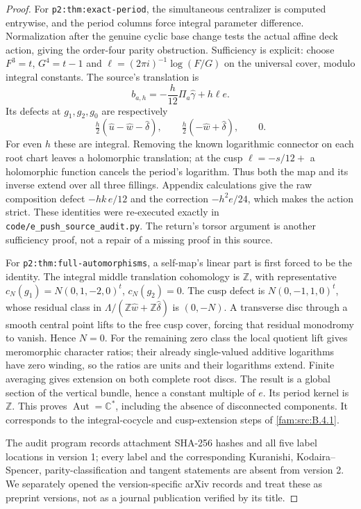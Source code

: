 \begin{proof}
For \texttt{p2:thm:exact-period}, the simultaneous centralizer
is computed entrywise, and the period columns force integral
parameter difference.  Normalization after the genuine cyclic
base change tests the actual affine deck action, giving the
order-four parity obstruction.  Sufficiency is explicit:
choose $F^3=t$, $G^4=t-1$ and
$\ell=(2\pi i)^{-1}\log(F/G)$ on the universal cover, modulo
integral constants.  The source's translation is
\[
 b_{a,h}=-\frac h{12}\Pi_a\widehat\gamma+h\ell e.
\]
Its defects at $g_1,g_2,g_0$ are respectively
\[
 \tfrac h2(\widehat u-\widehat w-\widehat\delta),\qquad
 \tfrac h2(-\widehat w+\widehat\delta),\qquad0.
\]
For even $h$ these are integral.  Removing the known logarithmic
connector on each root chart leaves a holomorphic translation;
at the cusp $\ell=-s/12+$ a holomorphic function cancels the
period's logarithm.  Thus both the map and its inverse extend
over all three fillings.  Appendix calculations give the raw
composition defect $-hk\,e/12$ and the correction
$-h^2e/24$, which makes the action strict.  These identities
were re-executed exactly in
\texttt{code/e\_push\_source\_audit.py}.  The return's torsor
argument is another sufficiency proof, not a repair of a
missing proof in this source.

For \texttt{p2:thm:full-automorphisms}, a self-map's linear
part is first forced to be the identity.  The integral middle
translation cohomology is $\mathbb Z$, with representative
$c_N(g_1)=N(0,1,-2,0)^t$, $c_N(g_2)=0$.
The cusp defect is $N(0,-1,1,0)^t$, whose residual class in
$\Lambda/(\mathbb Z\widehat w+\mathbb Z\widehat\delta)$ is
$(0,-N)$.  A transverse disc through a smooth central point
lifts to the free cusp cover, forcing that residual monodromy
to vanish.  Hence $N=0$.  For the remaining zero class the
local quotient lift gives meromorphic character ratios; their
already single-valued additive logarithms have zero winding,
so the ratios are units and their logarithms extend.  Finite
averaging gives extension on both complete root discs.  The
result is a global section of the vertical bundle, hence a
constant multiple of $e$.  Its period kernel is $\mathbb Z$.
This proves $\operatorname{Aut}=\mathbb C^*$, including the
absence of disconnected components.  It corresponds to the
integral-cocycle and cusp-extension steps of \cref{fam:src:B.4.1}.

The audit program records attachment SHA-256 hashes and all five
label locations in version 1; every label and the corresponding
Kuranishi, Kodaira--Spencer, parity-classification and tangent
statements are absent from version 2.  We separately opened the
version-specific arXiv records and treat these as preprint
versions, not as a journal publication verified by its title.
\end{proof}

